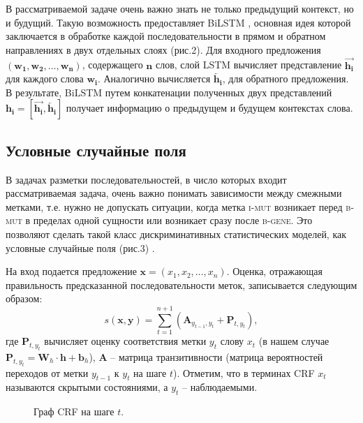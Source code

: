 \documentclass[12pt, a4paper]{article} %
\begin{document}
В рассматриваемой задаче очень важно знать не только предыдущий контекст, но и будущий. Такую возможность предоставляет BiLSTM \cite{Gers2000}, основная идея которой заключается в обработке каждой последовательности в прямом и обратном направлениях в двух отдельных слоях (рис.2). Для входного предложения $(\mathbf{w_1}, \mathbf{w_2}, \dots, \mathbf{w_n})$, содержащего $\mathbf{n}$ слов, слой LSTM вычисляет представление $\overrightarrow{\mathbf{h_i}}$ для каждого слова $\mathbf{w_{i}}$. Аналогично вычисляется $\overleftarrow{\mathbf{h_i}}$, для обратного предложения. В результате, BiLSTM путем конкатенации полученных двух представлений $\mathbf{h_i}=[\overrightarrow{\mathbf{h_i}},\overleftarrow{\mathbf{h_i}}]$ получает информацию о предыдущем и будущем контекстах слова.

\subsection{Условные случайные поля}
В задачах разметки последовательностей, в число которых входит рассматриваемая задача, очень важно понимать зависимости между смежными метками, т.е. нужно не допускать ситуации, когда метка \textsc{i-mut} возникает перед \textsc{b-mut} в пределах одной сущности или возникает сразу после \textsc{b-gene}. Это позволяют сделать такой класс дискриминативных статистических моделей, как условные случайные поля (рис.3) \cite{Sutton12anintroduction, Lafferty01conditionalrandom}.

На вход подается предложение $\mathbf{x}=\left(\mathit{x_1, x_2, \dots, x_n}\right)$. Оценка, отражающая правильность предсказанной последовательности меток, записывается следующим образом:
$$\mathit{s}\left(\mathbf{x},\mathbf{y}\right)=\sum_{t=1}^{n+1}\left(\mathbf{A}_{y_{t-1},y_t}+\mathbf{P}_{t, y_t}\right),$$
где 	$\mathbf{P}_{t, y_t}$ вычисляет оценку соответствия метки $\mathit{y_t}$ слову $\mathit{x_t}$ (в нашем случае $\mathbf{P}_{t, y_t}=\mathbf{W}_h\cdot\mathbf{h}+\mathbf{b}_h$), $\mathbf{A}$ -- матрица транзитивности (матрица вероятностей переходов от метки $y_{t-1}$ к $y_t$ на шаге $\mathit{t}$). Отметим, что в терминах CRF $\mathit{x_t}$ называются скрытыми состояниями, а $\mathit{y_t}$ -- наблюдаемыми.

\begin{figure}[h]
	\caption{Граф CRF на шаге $\mathit{t}$.}
	\label{ris:image4}
\end{figure}
\end{document}
